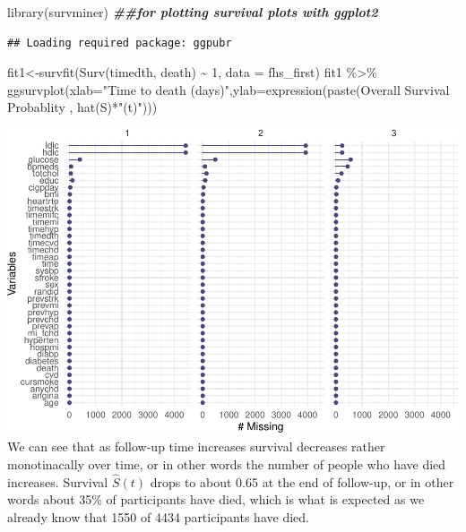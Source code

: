 \documentclass[
]{book}
\newenvironment{Shaded}{\begin{snugshade}}{\end{snugshade}}
\newcommand{\AttributeTok}[1]{\textcolor[rgb]{0.77,0.63,0.00}{#1}}
\newcommand{\DecValTok}[1]{\textcolor[rgb]{0.00,0.00,0.81}{#1}}
\newcommand{\DocumentationTok}[1]{\textcolor[rgb]{0.56,0.35,0.01}{\textbf{\textit{#1}}}}
\newcommand{\FunctionTok}[1]{\textcolor[rgb]{0.00,0.00,0.00}{#1}}
\newcommand{\NormalTok}[1]{#1}
\newcommand{\OtherTok}[1]{\textcolor[rgb]{0.56,0.35,0.01}{#1}}
\newcommand{\SpecialCharTok}[1]{\textcolor[rgb]{0.00,0.00,0.00}{#1}}
\newcommand{\StringTok}[1]{\textcolor[rgb]{0.31,0.60,0.02}{#1}}
\begin{document}
\begin{Shaded}
\begin{Highlighting}[]
\FunctionTok{library}\NormalTok{(survminer) }\DocumentationTok{\#\#for plotting survival plots with ggplot2}
\end{Highlighting}
\end{Shaded}

\begin{verbatim}
## Loading required package: ggpubr
\end{verbatim}

\begin{Shaded}
\begin{Highlighting}[]
\NormalTok{fit1}\OtherTok{\textless{}{-}}\FunctionTok{survfit}\NormalTok{(}\FunctionTok{Surv}\NormalTok{(timedth, death) }\SpecialCharTok{\textasciitilde{}} \DecValTok{1}\NormalTok{, }\AttributeTok{data =}\NormalTok{ fhs\_first)}
\NormalTok{fit1 }\SpecialCharTok{\%\textgreater{}\%}
\FunctionTok{ggsurvplot}\NormalTok{(}\AttributeTok{xlab=}\StringTok{"Time to death (days)"}\NormalTok{,}\AttributeTok{ylab=}\FunctionTok{expression}\NormalTok{(}\FunctionTok{paste}\NormalTok{(}\StringTok{\textquotesingle{}Overall Survival Probablity \textquotesingle{}}\NormalTok{, }\FunctionTok{hat}\NormalTok{(S)}\SpecialCharTok{*}\StringTok{"(t)"}\NormalTok{)))}
\end{Highlighting}
\end{Shaded}

\includegraphics{adv_epi_analysis_files/figure-latex/unnamed-chunk-98-1.pdf}
We can see that as follow-up time increases survival decreases rather monotinacally over time, or in other words the number of people who have died increases. Survival \(\hat{S}(t)\) drops to about 0.65 at the end of follow-up, or in other words about 35\% of participants have died, which is what is expected as we already know that 1550 of 4434 participants have died.
\end{document}

